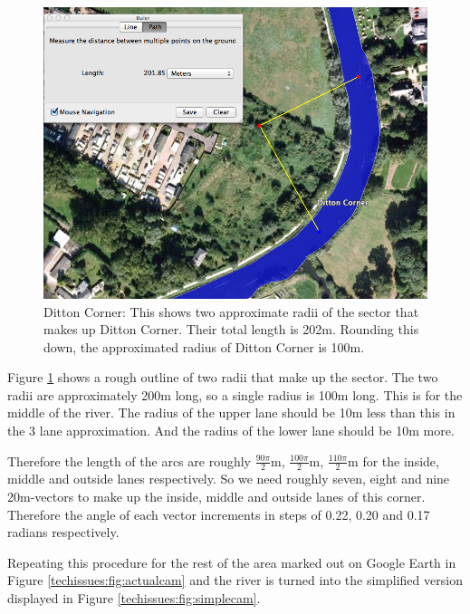       \begin{figure}
      \begin{center}
        \includegraphics[scale=0.55]{images/DittonCornerRadius.png}
        \caption{Ditton Corner: This shows two approximate radii of the sector that makes up Ditton Corner. Their total length is 202m. Rounding this down, the approximated radius of Ditton Corner is 100m.}
        \label{fig:dittoncorner:radius}
      \end{center}
      \end{figure}
      
      Figure \ref{fig:dittoncorner:radius} shows a rough outline of two radii that make up the sector. The two radii are approximately 200m long, so a single radius is 100m long. This is for the middle of the river. The radius of the upper lane should be 10m less than this in the 3 lane approximation. And the radius of the lower lane should be 10m more.
      
      Therefore the length of the arcs are roughly $\frac{90\pi}{2}$m, $\frac{100\pi}{2}$m, $\frac{110\pi}{2}$m for the inside, middle and outside lanes respectively. So we need roughly seven, eight and nine 20m-vectors to make up the inside, middle and outside lanes of this corner. Therefore the angle of each vector increments in steps of 0.22, 0.20 and 0.17 radians respectively.
      
      Repeating this procedure for the rest of the area marked out on Google Earth in Figure \ref{techissues:fig:actualcam} and the river is turned into the simplified version displayed in Figure \ref{techissues:fig:simplecam}.
      
